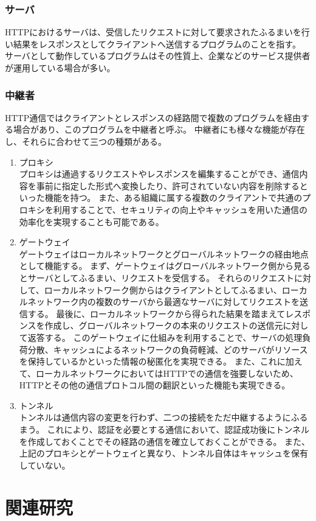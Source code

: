 \subsubsection{サーバ}
HTTPにおけるサーバは、受信したリクエストに対して要求されたふるまいを行い結果をレスポンスとしてクライアントへ送信するプログラムのことを指す。
サーバとして動作しているプログラムはその性質上、企業などのサービス提供者が運用している場合が多い。

\subsubsection{中継者}
\label{sec:intermediary}
HTTP通信ではクライアントとレスポンスの経路間で複数のプログラムを経由する場合があり、このプログラムを中継者と呼ぶ。
中継者にも様々な機能が存在し、それらに合わせて三つの種類がある。
\begin{enumerate}
\item プロキシ\\
プロキシは通過するリクエストやレスポンスを編集することができ、通信内容を事前に指定した形式へ変換したり、許可されていない内容を削除するといった機能を持つ。
また、ある組織に属する複数のクライアントで共通のプロキシを利用することで、セキュリティの向上やキャッシュを用いた通信の効率化を実現することも可能である。
\item ゲートウェイ\\
ゲートウェイはローカルネットワークとグローバルネットワークの経由地点として機能する。
まず、ゲートウェイはグローバルネットワーク側から見るとサーバとしてふるまい、リクエストを受信する。
それらのリクエストに対して、ローカルネットワーク側からはクライアントとしてふるまい、ローカルネットワーク内の複数のサーバから最適なサーバに対してリクエストを送信する。
最後に、ローカルネットワークから得られた結果を踏まえてレスポンスを作成し、グローバルネットワークの本来のリクエストの送信元に対して返答する。
このゲートウェイに仕組みを利用することで、サーバの処理負荷分散、キャッシュによるネットワークの負荷軽減、どのサーバがリソースを保持しているかといった情報の秘匿化を実現できる。
また、これに加えて、ローカルネットワークにおいてはHTTPでの通信を強要しないため、HTTPとその他の通信プロトコル間の翻訳といった機能も実現できる。
\item トンネル\\
トンネルは通信内容の変更を行わず、二つの接続をただ中継するようにふるまう。
これにより、認証を必要とする通信において、認証成功後にトンネルを作成しておくことでその経路の通信を確立しておくことができる。
また、上記のプロキシとゲートウェイと異なり、トンネル自体はキャッシュを保有していない。
\end{enumerate}

\section{関連研究}
